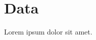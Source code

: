 \documentclass[11pt]{article}
\begin{document}

\section{Data}
Lorem ipsum dolor sit amet. 
\end{document}
